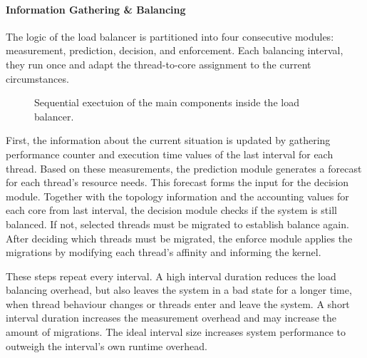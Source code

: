 \paragraph{Information Gathering \& Balancing}
The logic of the load balancer is partitioned into four consecutive modules:
measurement, prediction, decision, and enforcement.
Each balancing interval, they run once and adapt the thread-to-core
assignment to the current circumstances.

\begin{figure}[h]
  \setcapindent*{1em}
  \begin{captionbeside}{Sequential exectuion of the main components inside the load
  balancer.}
  
  \end{captionbeside}
  \label{arch:fig:intervalcycle}
\end{figure}

First, the information about the current situation is updated by gathering
performance counter and execution time values of the last interval for each
thread.
Based on these measurements, the prediction module generates a forecast for
each thread's resource needs.
This forecast forms the input for the decision module.
Together with the topology information and the accounting values for each core
from last interval, the decision module checks if the system is still balanced.
If not, selected threads must be migrated to establish balance again.
After deciding which threads must be migrated, the enforce module applies the
migrations by modifying each thread's affinity and informing the kernel.

These steps repeat every interval. A high interval duration reduces the
load balancing overhead, but also leaves the system in a bad state for a longer
time, when thread behaviour changes or threads enter and leave the system.
A short interval duration increases the measurement overhead and may increase
the amount of migrations.
The ideal interval size increases system performance to outweigh the interval's
own runtime overhead.
\\

